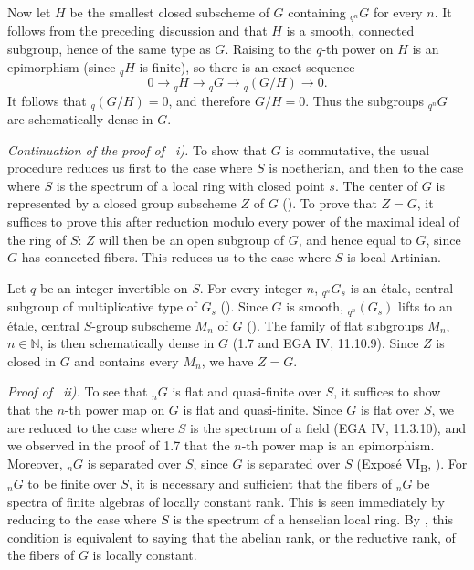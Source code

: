 Now let \(H\) be the smallest closed subscheme of \(G\) containing
\({}_{q^n}G\) for every \(n\). It follows from the preceding
discussion and  that \(H\) is a smooth, connected
subgroup, hence of the same type as \(G\). Raising to the \(q\)-th
power on \(H\) is an epimorphism (since \({}_{q}H\) is finite), so
there is an exact sequence
\[
  0\longrightarrow {}_{q}H\longrightarrow {}_{q}G
  \longrightarrow {}_{q}(G/H)\longrightarrow 0.
\]
It follows that \({}_{q}(G/H)=0\), and therefore \(G/H=0\). Thus the
subgroups \({}_{q^n}G\) are schematically dense in \(G\).

\smallskip
\noindent\textit{Continuation of the proof of ~i).}
To show that \(G\) is commutative, the usual procedure reduces us
first to the case where \(S\) is noetherian, and then to the case
where \(S\) is the spectrum of a local ring with closed point \(s\).
The center of \(G\) is represented by a closed group subscheme \(Z\)
of \(G\) (). To prove that \(Z=G\), it suffices to
prove this after reduction modulo every power of the maximal ideal of
the ring of \(S\): \(Z\) will then be an open subgroup of \(G\), and
hence equal to \(G\), since \(G\) has connected fibers. This reduces
us to the case where \(S\) is local Artinian.

Let \(q\) be an integer invertible on \(S\). For every integer \(n\),
\({}_{q^n}G_s\) is an étale, central subgroup of multiplicative type
of \(G_s\) (). Since \(G\) is smooth,
\({}_{q^n}(G_s)\) lifts to an étale, central \(S\)-group subscheme
\(M_n\) of \(G\) (). The family of flat subgroups
\(M_n\), \(n\in\mathbb N\), is then schematically dense in \(G\)
(1.7 and EGA IV, 11.10.9). Since \(Z\) is closed in \(G\) and
contains every \(M_n\), we have \(Z=G\).

\smallskip
\noindent\textit{Proof of ~ii).}
To see that \({}_{n}G\) is flat and quasi-finite over \(S\), it
suffices to show that the \(n\)-th power map on \(G\) is flat and
quasi-finite. Since \(G\) is flat over \(S\), we are reduced to the
case where \(S\) is the spectrum of a field (EGA IV, 11.3.10), and
we observed in the proof of 1.7 that the \(n\)-th power map is an
epimorphism. Moreover, \({}_{n}G\) is separated over \(S\), since
\(G\) is separated over \(S\) (Exposé VI\textsubscript{B}, ).
For \({}_{n}G\) to be finite over \(S\), it is necessary and
sufficient that the fibers of \({}_{n}G\) be spectra of finite
algebras of locally constant rank. This is seen immediately by
reducing to the case where \(S\) is the spectrum of a henselian local
ring. By , this condition is equivalent to saying that the abelian
rank, or the reductive rank, of the fibers of \(G\) is locally
constant.

